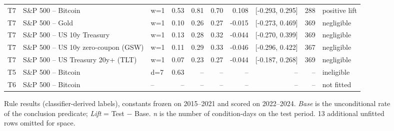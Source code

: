 \begin{figure}[t]
{\begin{tabular}{lllrrrrrrl}
T7 & S\&P 500 -- Bitcoin & w=1 & 0.53 & 0.81 & 0.70 & 0.108 & [-0.293, 0.295] & 288 & positive lift \\
T7 & S\&P 500 -- Gold & w=1 & 0.10 & 0.26 & 0.27 & -0.015 & [-0.273, 0.469] & 369 & negligible \\
T7 & S\&P 500 -- US 10y Treasury & w=1 & 0.13 & 0.28 & 0.32 & -0.044 & [-0.270, 0.399] & 369 & negligible \\
T7 & S\&P 500 -- US 10y zero-coupon (GSW) & w=1 & 0.11 & 0.29 & 0.33 & -0.046 & [-0.296, 0.422] & 367 & negligible \\
T7 & S\&P 500 -- US Treasury 20y+ (TLT) & w=1 & 0.07 & 0.23 & 0.27 & -0.044 & [-0.187, 0.268] & 369 & negligible \\
T5 & S\&P 500 -- Bitcoin & d=7 & 0.63 & -- & -- & -- & -- & -- & ineligible \\
T6 & S\&P 500 -- Bitcoin & -- & -- & -- & -- & -- & -- & -- & not fitted \\
\bottomrule
\end{tabular}
}
\caption{Rule results (classifier-derived labels), constants frozen on 2015--2021 and scored on 2022--2024. \emph{Base} is the unconditional rate of the conclusion predicate; \emph{Lift} = Test $-$ Base. \emph{n} is the number of condition-days on the test period. 13 additional unfitted rows omitted for space.}
\label{tab:rule-results_classifier-pub}
\end{figure}
